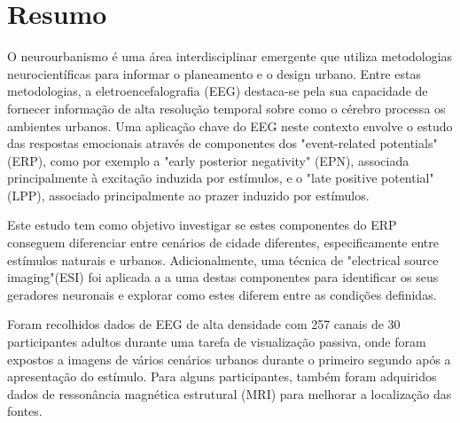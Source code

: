 
\section*{Resumo}


O neurourbanismo é uma área interdisciplinar emergente que utiliza metodologias neurocientíficas para informar o planeamento e o design urbano. Entre estas metodologias, a eletroencefalografia (EEG) destaca-se pela sua capacidade de fornecer informação de alta resoluç\~{a}o temporal sobre como o cérebro processa os ambientes urbanos. Uma aplicação chave do EEG neste contexto envolve o estudo das respostas emocionais através de componentes dos "event-related potentials" (ERP), como por exemplo a "early posterior negativity" (EPN), associada principalmente à excitação induzida por estímulos, e o "late positive potential" (LPP), associado principalmente ao prazer induzido por estímulos.

Este estudo tem como objetivo investigar se estes componentes do ERP conseguem diferenciar entre cenários de cidade diferentes, especificamente entre estímulos naturais e urbanos. Adicionalmente, uma técnica de "electrical source imaging"(ESI) foi aplicada a a uma destas componentes para identificar os seus geradores neuronais e explorar como estes diferem entre as condições definidas.

Foram recolhidos dados de EEG de alta densidade com 257 canais de 30 participantes adultos durante uma tarefa de visualização passiva, onde foram expostos a imagens de vários cenários urbanos durante o primeiro segundo após a apresentação do estímulo. Para alguns participantes, também foram adquiridos dados de ressonância magnética estrutural (MRI) para melhorar a localização das fontes.

